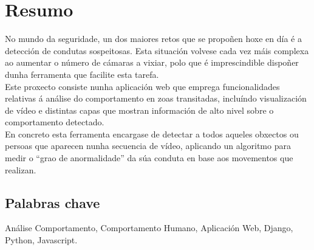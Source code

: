 \chapter*{Resumo}

No mundo da seguridade, un dos maiores retos que se propoñen hoxe en día é a detección de
condutas sospeitosas. Esta situación volvese cada vez máis complexa ao aumentar o número de
cámaras a vixiar, polo que é imprescindible dispoñer dunha ferramenta que facilite esta
tarefa.\\

Este proxecto consiste nunha aplicación web que emprega funcionalidades relativas á análise do
comportamento en zoas transitadas, incluíndo visualización de vídeo e distintas capas que
mostran información de alto nivel sobre o comportamento detectado.\\

En concreto esta ferramenta encargase de detectar a todos aqueles obxectos ou persoas que 
aparecen nunha secuencia de vídeo, aplicando un algoritmo para medir o ``grao de anormalidade''
da súa conduta en base aos movementos que realizan.\\

\section*{Palabras chave}

Análise Comportamento, Comportamento Humano, Aplicación Web, Django, Python, Javascript.
